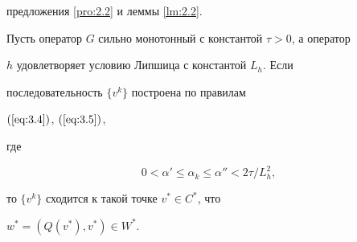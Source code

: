 предложения \ref{pro:2.2} и леммы \ref{lm:2.2}.


 


\begin{thm} \label{thm:3.1}


Пусть оператор $G$ сильно монотонный с константой $\tau >0$, а оператор 


$h$ удовлетворяет условию Липшица с константой $L_{h}$. Если 


последовательность $\{v^{k} \}$ построена по правилам


$(\ref{eq:3.4})$, $(\ref{eq:3.5})$, 


где


\begin{equation} \label{eq:3.6} 


0 < \alpha' \leq \alpha_{k} \leq \alpha'' < 2 \tau / L^2_{h}, 


\end{equation}


то $\{v^{k} \}$ сходится к такой точке $v^* \in C^*$, что 


$w^*=(Q (v^*), v^*) \in W^*$.


\end{thm}






